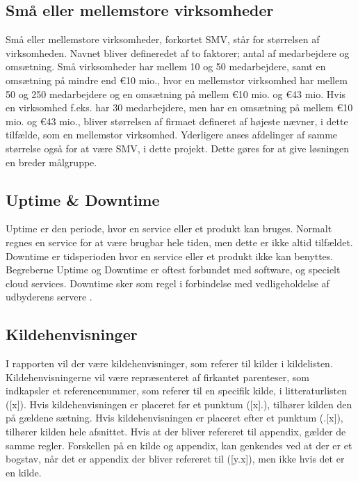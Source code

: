 \subsection{Små eller mellemstore virksomheder}
Små eller mellemstore virksomheder, forkortet SMV, står for størrelsen af virksomheden. Navnet bliver defineredet af to faktorer; antal af medarbejdere og omsætning. Små virksomheder har mellem 10 og 50 medarbejdere, samt en omsætning på mindre end \euro 10 mio., hvor en mellemstor virksomhed har mellem 50 og 250 medarbejdere og en omsætning på mellem \euro 10 mio. og \euro 43 mio. Hvis en virksomhed f.eks. har 30 medarbejdere, men har en omsætning på mellem \euro 10 mio. og \euro 43 mio., bliver størrelsen af firmaet defineret af højeste nævner, i dette tilfælde, som en mellemstor virksomhed.\citep{SMV} Yderligere anses afdelinger af samme størrelse også for at være SMV, i dette projekt. Dette gøres for at give løsningen en breder målgruppe.

\subsection{Uptime \& Downtime}
Uptime er den periode, hvor en service eller et produkt kan bruges. Normalt regnes en service for at være brugbar hele tiden, men dette er ikke altid tilfældet. Downtime er tidsperioden hvor en service eller et produkt ikke kan benyttes. Begreberne Uptime og Downtime er oftest forbundet med software, og specielt cloud services.\citep{drpbx_downtime, UpDown} Downtime sker som regel i forbindelse med vedligeholdelse af udbyderens servere \citep{drpbx_downtime}.

\subsection{Kildehenvisninger}
I rapporten vil der være kildehenvisninger, som referer til kilder i kildelisten. Kildehenvisningerne vil være repræsenteret af firkantet parenteser, som indkapsler et referencenummer, som referer til en specifik kilde, i litteraturlisten ([x]). Hvis kildehenvisningen er placeret før et punktum ([x].), tilhører kilden den på gældene sætning. Hvis kildehenvisningen er placeret efter et punktum (.[x]), tilhører kilden hele afsnittet. Hvis at der bliver refereret til appendix, gælder de samme regler. Forskellen på en kilde og appendix, kan genkendes ved at der er et bogstav, når det er appendix der bliver refereret til ([y.x]), men ikke hvis det er en kilde.